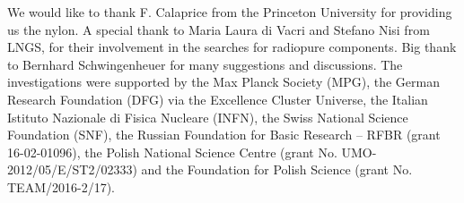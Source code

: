 \documentclass[twocolumn,epjc3]{svjour3}
\begin{document}
\begin{acknowledgements}
We would like to thank F. Calaprice from the Princeton University for providing us the nylon. A special thank to Maria Laura di Vacri and Stefano Nisi from LNGS, for their involvement in the searches for radiopure components. Big thank to Bernhard Schwingenheuer for many suggestions and discussions. The investigations were supported by the Max Planck Society (MPG), the German Research Foundation (DFG) via the Excellence Cluster Universe, the Italian Istituto Nazionale di Fisica Nucleare (INFN), the Swiss National Science Foundation (SNF), the Russian Foundation for Basic Research – RFBR (grant 16-02-01096), the Polish National Science Centre (grant No. UMO-2012/05/E/ST2/02333) and the Foundation for Polish Science (grant No. TEAM/2016-2/17). 
\end{acknowledgements}

\end{document}
